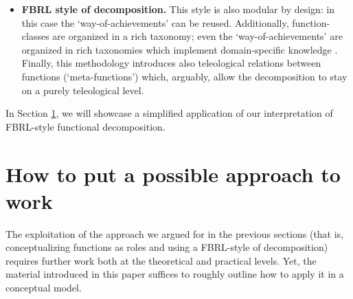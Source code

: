\documentclass[
]{ceurart}
\begin{document}
\begin{itemize}
  \item \textbf{FBRL style of decomposition.} This style is also modular by design: in this case the `way-of-achievements' can be reused. Additionally, function-classes are organized in a rich taxonomy; even the `way-of-achievements' are organized in rich taxonomies which implement domain-specific knowledge \cite{kitamuraOntologybasedDescriptionFunctional2003}. Finally, this methodology introduces also teleological relations between functions (`meta-functions') which, arguably, allow the decomposition to stay on a purely teleological level. 
\end{itemize}
In Section \ref{sec:use-case}, we will showcase a simplified application of our interpretation of FBRL-style functional decomposition.


\section{How to put a possible approach to work}\label{sec:use-case}

The exploitation of the approach we argued for in the previous sections (that is, conceptualizing functions as roles and using a FBRL-style of decomposition) requires further work both at the theoretical and practical levels. Yet, the material introduced in this paper suffices to roughly outline how to apply it in a conceptual model.
\end{document}
